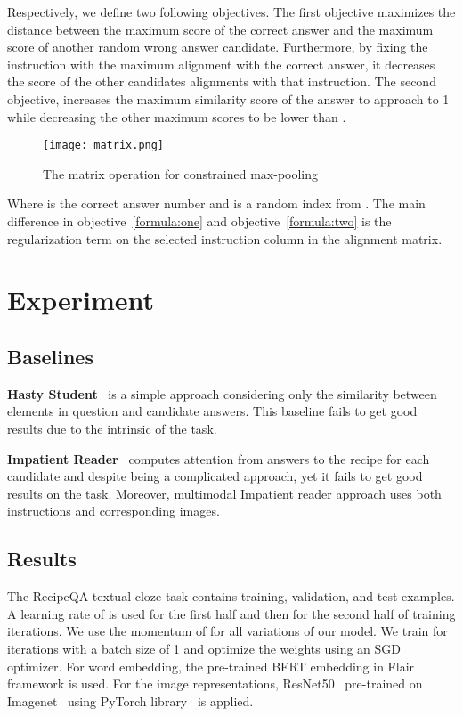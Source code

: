 \documentclass[11pt,a4paper]{article}
\begin{document}
Respectively, we define two following objectives. The first objective maximizes the distance between the maximum score of the correct answer and the maximum score of another random wrong answer candidate. Furthermore, by fixing the instruction with the maximum alignment with the correct answer, it decreases the score of the other candidates alignments with that instruction. The second objective, increases the maximum similarity score of the answer to approach to 1 while decreasing the other maximum scores to be lower than . 
\begin{figure}[!h]
    \centering
    \texttt{[image: matrix.png]}
    \caption{The matrix operation for constrained max-pooling}
    \label{fig:approach}
\end{figure}


Where  is the correct answer number and  is a random index from . The main difference in objective~\ref{formula:one} and objective~\ref{formula:two} is the regularization term on the selected instruction column in the alignment matrix.

\section{Experiment}
\subsection{Baselines}
\textbf{Hasty Student}~\cite{tapaswi2016movieqa} is a simple approach considering only the similarity between elements in question and candidate answers. This baseline fails to get good results due to the intrinsic of the task.

\noindent \textbf{Impatient Reader}~\cite{hermann2015teaching} computes attention from answers to the recipe for each candidate and despite being a complicated approach, yet it fails to get good results on the task. Moreover, multimodal Impatient reader approach uses both instructions and corresponding images.
\subsection{Results}
The RecipeQA textual cloze task contains  training,  validation, and  test examples. A learning rate of  is used for the first half and then  for the second half of training iterations. We use the momentum of  for all variations of our model. We train for  iterations with a batch size of 1 and optimize the weights using an SGD optimizer.
For word embedding, the pre-trained BERT embedding in Flair framework is used. For the image representations,  ResNet50~\cite{he2016deep} pre-trained on Imagenet~\cite{russakovsky2015imagenet} using PyTorch library~\cite{NEURIPS2019_9015} is applied.
\end{document}
